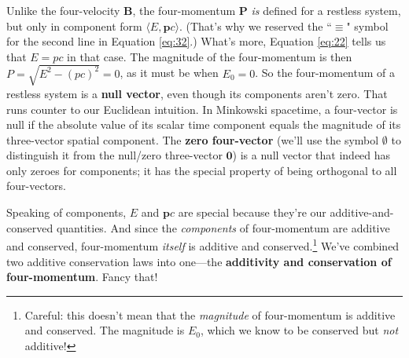 \documentclass[12pt]{article}
\renewcommand{\vv}[1]{\mathbf{#1}}
\begin{document}
Unlike the four-velocity $\vv B$, the four-momentum $\vv P$ \emph{is} defined for a restless system, but only in component form $\langle E, \vv p c \rangle$. (That's why we reserved the ``$\equiv$" symbol for the second line in Equation \ref{eq:32}.) What's more, Equation \ref{eq:22} tells us that $E=p c$ in that case. The magnitude of the four-momentum is then $P = \sqrt{E^2 - (p c)^2} = 0$, as it must be when $E_0 = 0$. So the four-momentum of a restless system is a \textbf{null vector}, even though its components aren't zero. That runs counter to our Euclidean intuition. In Minkowski spacetime, a four-vector is null if the absolute value of its scalar time component equals the magnitude of its three-vector spatial component. The \textbf{zero four-vector} (we'll use the symbol \mbox{\boldmath$\emptyset$} to distinguish it from the null/zero three-vector $\vv 0$) is a null vector that indeed has only zeroes for components; it has the special property of being orthogonal to all four-vectors.

Speaking of components, $E$ and $\vv p c$ are special because they're our additive-and-conserved quantities. And since the \emph{components} of four-momentum are additive and conserved, four-momentum \emph{itself} is additive and conserved.\footnote{Careful: this doesn't mean that the \emph{magnitude} of four-momentum is additive and conserved. The magnitude is $E_0$, which we know to be conserved but \emph{not} additive!} We've combined two additive conservation laws into one---the \textbf{additivity and conservation of four-momentum}. Fancy that!
\end{document}
